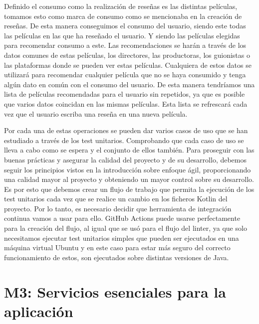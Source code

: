 Definido el consumo como la realización de reseñas es las distintas películas, tomamos esto como marca 
de consumo como se mencionaba en la creación de reseñas. De esta manera conseguimos el consumo del 
usuario, siendo este todas las películas en las que ha reseñado el usuario. Y siendo las películas 
elegidas para recomendar consumo a este. Las recomendaciones se harán a través de los datos comunes de 
estas películas, los directores, las productoras, los guionistas o las plataformas donde se pueden ver 
estas películas. Cualquiera de estos datos se utilizará para recomendar cualquier película que no se 
haya consumido y tenga algún dato en común con el consumo del usuario. De esta manera tendríamos una 
lista de películas recomendadas para el usuario sin repetidos, ya que es posible que varios datos 
coincidan en las mismas películas. Esta lista se refrescará cada vez que el usuario escriba una reseña 
en una nueva película.

Por cada una de estas operaciones se pueden dar varios casos de uso que se han estudiado a través de 
los test unitarios. Comprobando que cada caso de uso se lleva a cabo como se espera y el conjunto de 
ellos también. Para proseguir con las buenas prácticas y asegurar la calidad del proyecto y de su desarrollo, 
debemos seguir los principios vistos en la introducción sobre enfoque ágil, proporcionando una calidad mayor al 
proyecto y obteniendo un mayor control sobre su desarrollo. Es por esto que debemos crear un flujo de trabajo 
que permita la ejecución de los test unitarios cada vez que se realice un cambio en los ficheros Kotlin del 
proyecto. Por lo tanto, es necesario decidir que herramienta de integración continua vamos a usar para ello. 
GitHub Actions puede usarse perfectamente para la creación del flujo, al igual que se usó para el flujo del 
linter, ya que solo necesitamos ejecutar test unitarios simples que pueden ser ejecutados en una máquina virtual 
Ubuntu y en este caso para estar más seguro del correcto funcionamiento de estos, son ejecutados sobre distintas 
versiones de Java.

\section{M3: Servicios esenciales para la aplicación}

